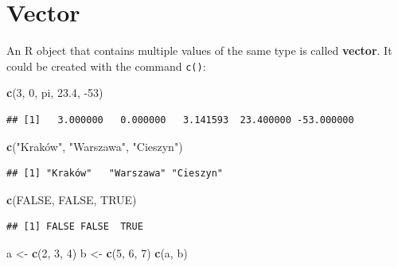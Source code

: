\documentclass[
]{book}
\newenvironment{Shaded}{\begin{snugshade}}{\end{snugshade}}
\newcommand{\DecValTok}[1]{\textcolor[rgb]{0.00,0.00,0.81}{#1}}
\newcommand{\FloatTok}[1]{\textcolor[rgb]{0.00,0.00,0.81}{#1}}
\newcommand{\KeywordTok}[1]{\textcolor[rgb]{0.13,0.29,0.53}{\textbf{#1}}}
\newcommand{\NormalTok}[1]{#1}
\newcommand{\OtherTok}[1]{\textcolor[rgb]{0.56,0.35,0.01}{#1}}
\newcommand{\StringTok}[1]{\textcolor[rgb]{0.31,0.60,0.02}{#1}}
\begin{document}
\hypertarget{vector}{%
\section{Vector}\label{vector}}

An R object that contains multiple values of the same type is called \textbf{vector}. It could be created with the command \texttt{c()}:

\begin{Shaded}
\begin{Highlighting}[]
\KeywordTok{c}\NormalTok{(}\DecValTok{3}\NormalTok{, }\DecValTok{0}\NormalTok{, pi, }\FloatTok{23.4}\NormalTok{, }\DecValTok{-53}\NormalTok{)}
\end{Highlighting}
\end{Shaded}

\begin{verbatim}
## [1]   3.000000   0.000000   3.141593  23.400000 -53.000000
\end{verbatim}

\begin{Shaded}
\begin{Highlighting}[]
\KeywordTok{c}\NormalTok{(}\StringTok{"Kraków", "}\NormalTok{Warszawa}\StringTok{", "}\NormalTok{Cieszyn}\StringTok{")}
\end{Highlighting}
\end{Shaded}

\begin{verbatim}
## [1] "Kraków"   "Warszawa" "Cieszyn"
\end{verbatim}

\begin{Shaded}
\begin{Highlighting}[]
\KeywordTok{c}\NormalTok{(}\OtherTok{FALSE}\NormalTok{, }\OtherTok{FALSE}\NormalTok{, }\OtherTok{TRUE}\NormalTok{)}
\end{Highlighting}
\end{Shaded}

\begin{verbatim}
## [1] FALSE FALSE  TRUE
\end{verbatim}

\begin{Shaded}
\begin{Highlighting}[]
\NormalTok{a <-}\StringTok{ }\KeywordTok{c}\NormalTok{(}\DecValTok{2}\NormalTok{, }\DecValTok{3}\NormalTok{, }\DecValTok{4}\NormalTok{)}
\NormalTok{b <-}\StringTok{ }\KeywordTok{c}\NormalTok{(}\DecValTok{5}\NormalTok{, }\DecValTok{6}\NormalTok{, }\DecValTok{7}\NormalTok{)}
\KeywordTok{c}\NormalTok{(a, b)}
\end{Highlighting}
\end{Shaded}
\end{document}
